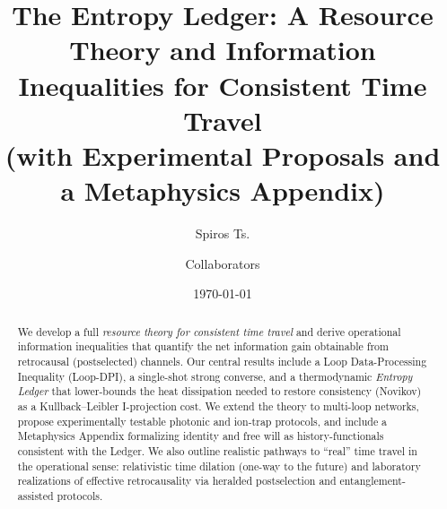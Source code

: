 \documentclass[11pt]{article}
\title{The Entropy Ledger: A Resource Theory and Information Inequalities for Consistent Time Travel\\
\large (with Experimental Proposals and a Metaphysics Appendix)}
\author{Spiros Ts. \and Collaborators}
\date{\today}
\begin{document}
\maketitle

\begin{abstract}
We develop a full \emph{resource theory for consistent time travel} and derive operational information inequalities that quantify the net information gain obtainable from retrocausal (postselected) channels. Our central results include a Loop Data-Processing Inequality (Loop-DPI), a single-shot strong converse, and a thermodynamic \emph{Entropy Ledger} that lower-bounds the heat dissipation needed to restore consistency (Novikov) as a Kullback--Leibler I-projection cost. We extend the theory to multi-loop networks, propose experimentally testable photonic and ion-trap protocols, and include a Metaphysics Appendix formalizing identity and free will as history-functionals consistent with the Ledger. We also outline realistic pathways to ``real'' time travel in the operational sense: relativistic time dilation (one-way to the future) and laboratory realizations of effective retrocausality via heralded postselection and entanglement-assisted protocols.
\end{abstract}









\appendix









\end{document}

